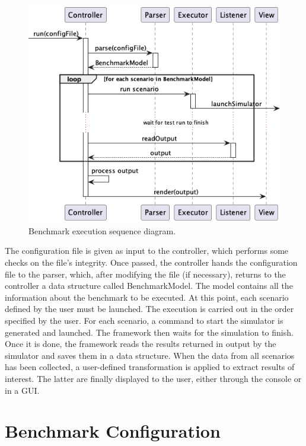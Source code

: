 \documentclass[12pt,a4paper,openright,twoside]{book}
\begin{document}
\begin{figure}[h!]
  \centering
  \includegraphics[width=\textwidth]{figures/execution-sequence-diagram.png}
  \caption{Benchmark execution sequence diagram.}
  \label{fig:benchmark-sequence-diagram}
\end{figure}

The configuration file is given as input to the controller, which performs some checks on the file's integrity.
Once passed, the controller hands the configuration file to the parser, which, after modifying the file (if necessary), returns to the controller a data structure called BenchmarkModel.
The model contains all the information about the benchmark to be executed.
At this point, each scenario defined by the user must be launched.
The execution is carried out in the order specified by the user.
For each scenario, a command to start the simulator is generated and launched.
The framework then waits for the simulation to finish.
Once it is done, the framework reads the results returned in output by the simulator and saves them in a data structure.
When the data from all scenarios has been collected, a user-defined transformation is applied to extract results of interest.
The latter are finally displayed to the user, either through the console or in a GUI.

\section{Benchmark Configuration}
\end{document}
